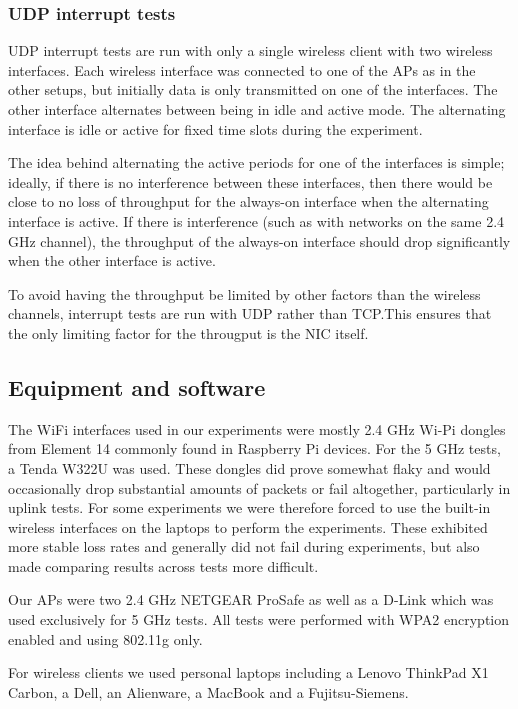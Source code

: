 \subsubsection{UDP interrupt tests}
\label{sec:met:setups:intudp}
UDP interrupt tests are run with only a single wireless client with two wireless
interfaces. Each wireless interface was connected to one of the APs as in the
other setups, but initially data is only transmitted on one of the interfaces.
The other interface alternates between being in idle and active mode. The
alternating interface is idle or active for fixed time slots during the
experiment.

The idea behind alternating the active periods for one of the interfaces is
simple; ideally, if there is no interference between these interfaces, then
there would be close to no loss of throughput for the always-on interface when
the alternating interface is active. If there is interference (such as with
networks on the same 2.4 GHz channel), the throughput of the always-on interface
should drop significantly when the other interface is active.

To avoid having the throughput be limited by other factors than the wireless
channels, interrupt tests are run with UDP rather than TCP.\@ This ensures that
the only limiting factor for the througput is the NIC itself.

\subsection{Equipment and software}
\label{sec:met:equip}
The WiFi interfaces used in our experiments were mostly 2.4 GHz Wi-Pi dongles
from Element 14 commonly found in Raspberry Pi devices. For the 5 GHz tests, a
Tenda W322U
was used. These dongles did prove somewhat flaky and would occasionally drop
substantial amounts of packets or fail altogether, particularly in uplink tests.
For some experiments we were therefore forced to use the built-in wireless
interfaces on the laptops to perform the experiments. These exhibited
more stable loss rates and generally did not fail during experiments, but also
made comparing results across tests more difficult.

Our APs were two 2.4 GHz
NETGEAR ProSafe
as well as a
D-Link
which was used exclusively for 5 GHz tests. All tests were performed with WPA2
encryption enabled and using 802.11g only.

For wireless clients we used personal laptops including a Lenovo ThinkPad X1
Carbon, a Dell, an Alienware, a MacBook and a Fujitsu-Siemens.


